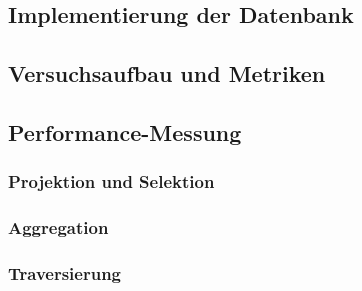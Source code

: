 
\subsection{Implementierung der Datenbank}
\subsection{Versuchsaufbau und Metriken}
\subsection{Performance-Messung}
\subsubsection{Projektion und Selektion}
\subsubsection{Aggregation}
\subsubsection{Traversierung}